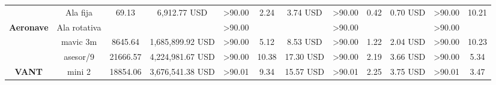 \begin{table}[]
\begin{tabular}{cc|ccc|ccc|ccc|c|}
    \multicolumn{1}{|c|}{\cellcolor[HTML]{9698ED}} &
      \cellcolor[HTML]{9698ED}Ala fija &
      \multicolumn{1}{c|}{69.13} &
      \multicolumn{1}{c|}{6,912.77 USD} &
      \textgreater{}90.00 &
      \multicolumn{1}{c|}{2.24} &
      \multicolumn{1}{c|}{3.74 USD} &
      \textgreater{}90.00 &
      \multicolumn{1}{c|}{0.42} &
      \multicolumn{1}{c|}{0.70 USD} &
      \textgreater{}90.00 &
      10.21 \\ \cline{2-12} 
    \multicolumn{1}{|c|}{\multirow{-2}{*}{\cellcolor[HTML]{9698ED}\textbf{Aeronave}}} &
      \cellcolor[HTML]{9698ED}Ala rotativa &
      \multicolumn{1}{c|}{} &
      \multicolumn{1}{c|}{} &
      \textgreater{}90.00 &
      \multicolumn{1}{c|}{} &
      \multicolumn{1}{c|}{} &
      \textgreater{}90.00 &
      \multicolumn{1}{c|}{} &
      \multicolumn{1}{c|}{} &
      \textgreater{}90.00 &
       \\ \hline
    \multicolumn{1}{|c|}{\cellcolor[HTML]{9698ED}} &
      \cellcolor[HTML]{9698ED}mavic 3m &
      \multicolumn{1}{c|}{8645.64} &
      \multicolumn{1}{c|}{ 1,685,899.92  USD} &
      \textgreater{}90.00 &
      \multicolumn{1}{c|}{5.12} &
      \multicolumn{1}{c|}{8.53 USD} &
      \textgreater{}90.00 &
      \multicolumn{1}{c|}{1.22} &
      \multicolumn{1}{c|}{2.04 USD} &
      \textgreater{}90.00 &
      10.23 \\ \cline{2-12} 
    \multicolumn{1}{|c|}{\cellcolor[HTML]{9698ED}} &
      \cellcolor[HTML]{9698ED}asesor/9 &
      \multicolumn{1}{c|}{21666.57} &
      \multicolumn{1}{c|}{ 4,224,981.67 USD } &
      \textgreater{}90.00 &
      \multicolumn{1}{c|}{10.38} &
      \multicolumn{1}{c|}{17.30 USD} &
      \textgreater{}90.00 &
      \multicolumn{1}{c|}{2.19} &
      \multicolumn{1}{c|}{3.66 USD} &
      \textgreater{}90.00 &
      5.34 \\ \cline{2-12} 
    \multicolumn{1}{|c|}{\multirow{-3}{*}{\cellcolor[HTML]{9698ED}\textbf{VANT}}} &
      \cellcolor[HTML]{9698ED}mini 2 &
      \multicolumn{1}{c|}{18854.06} &
      \multicolumn{1}{c|}{ 3,676,541.38 USD } &
      \textgreater{}90.01 &
      \multicolumn{1}{c|}{9.34} &
      \multicolumn{1}{c|}{15.57 USD} &
      \textgreater{}90.01 &
      \multicolumn{1}{c|}{2.25} &
      \multicolumn{1}{c|}{3.75 USD} &
      \textgreater{}90.01 &
      3.47 \\ \hline
    \end{tabular}%

\end{table}
